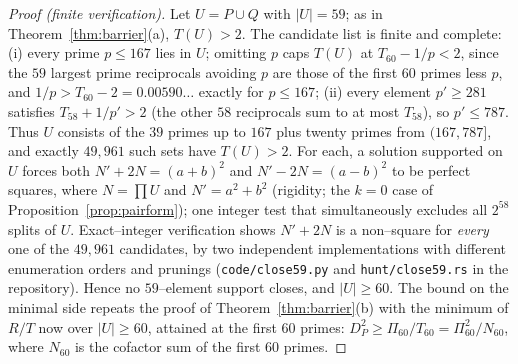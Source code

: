 \documentclass[11pt]{article}
\theoremstyle{definition}
\begin{document}
\begin{proof}[Proof (finite verification)]
Let $U=P\cup Q$ with $|U|=59$; as in Theorem~\ref{thm:barrier}(a), $T(U)>2$. The candidate list is
finite and complete: \textup{(i)} every prime $p\le167$ lies in $U$; omitting $p$ caps $T(U)$ at
$T_{60}-1/p<2$, since the $59$ largest prime reciprocals avoiding $p$ are those of the first $60$
primes less $p$, and $1/p>T_{60}-2=0.00590\ldots$ exactly for $p\le167$; \textup{(ii)} every element
$p'\ge281$ satisfies $T_{58}+1/p'>2$ (the other $58$ reciprocals sum to at most $T_{58}$), so
$p'\le787$. Thus $U$ consists of the $39$ primes up to $167$ plus twenty primes from
$(167,787]$, and exactly $49{,}961$ such sets have $T(U)>2$. For each, a solution supported on $U$
forces both $N'+2N=(a+b)^2$ and $N'-2N=(a-b)^2$ to be perfect squares, where $N=\prod U$ and
$N'=a^2+b^2$ (rigidity; the $k=0$ case of Proposition~\ref{prop:pairform}); one integer test that
simultaneously excludes all $2^{58}$ splits of $U$. Exact--integer verification shows $N'+2N$ is a
non--square for \emph{every} one of the $49{,}961$ candidates, by two independent implementations
with different enumeration orders and prunings (\texttt{code/close59.py} and
\texttt{hunt/close59.rs} in the repository). Hence no $59$--element support closes, and
$|U|\ge60$. The bound on the minimal side repeats the proof of Theorem~\ref{thm:barrier}(b) with the
minimum of $R/T$ now over $|U|\ge60$, attained at the first $60$ primes:
$D_P^2\ge\Pi_{60}/T_{60}=\Pi_{60}^2/N_{60}$, where $N_{60}$ is the cofactor sum of the first $60$
primes.
\end{proof}
\end{document}
